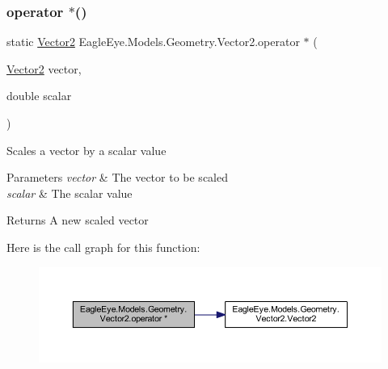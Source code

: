 \subsubsection{\texorpdfstring{operator $\ast$()}{operator *()}}
{\footnotesize\ttfamily static \mbox{\hyperlink{struct_eagle_eye_1_1_models_1_1_geometry_1_1_vector2}{Vector2}} Eagle\+Eye.\+Models.\+Geometry.\+Vector2.\+operator $\ast$ (\begin{DoxyParamCaption}\item[{\mbox{\hyperlink{struct_eagle_eye_1_1_models_1_1_geometry_1_1_vector2}{Vector2}}}]{vector,  }\item[{double}]{scalar }\end{DoxyParamCaption})\hspace{0.3cm}{\ttfamily [static]}}



Scales a vector by a scalar value 


\begin{DoxyParams}{Parameters}
{\em vector} & The vector to be scaled\\
\hline
{\em scalar} & The scalar value\\
\hline
\end{DoxyParams}
\begin{DoxyReturn}{Returns}
A new scaled vector
\end{DoxyReturn}
Here is the call graph for this function\+:\nopagebreak
\begin{figure}[H]
\begin{center}
\leavevmode
\includegraphics[width=350pt]{struct_eagle_eye_1_1_models_1_1_geometry_1_1_vector2_a22a207e259bc6984ae867a3911a93f46_cgraph}
\end{center}
\end{figure}
\mbox{\label{struct_eagle_eye_1_1_models_1_1_geometry_1_1_vector2_a349448334f4d2eb0c85774289baf399d}} 
